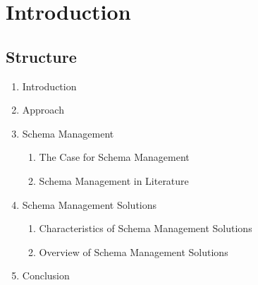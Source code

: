 
\section{Introduction}\label{sec:introduction}

\Blindtext[2]


\subsection{Structure}

\begin{enumerate}
  \item Introduction
  \item Approach
  \item Schema Management
        \begin{enumerate}
          \item The Case for Schema Management
          \item Schema Management in Literature
        \end{enumerate}
  \item Schema Management Solutions
        \begin{enumerate}
          \item Characteristics of Schema Management Solutions
          \item Overview of Schema Management Solutions
        \end{enumerate}
  \item Conclusion
\end{enumerate}